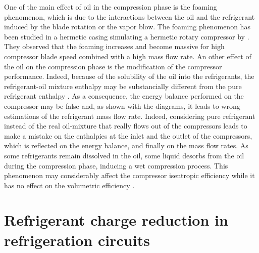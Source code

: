 One of the main effect of oil in the compression phase is the foaming
phenomenon, which is due to the interactions between the oil and the
refrigerant induced by the blade rotation or the vapor blow. The
foaming phenomenon has been studied in a hermetic casing simulating
a hermetic rotary compressor by
\citet{Yanagisawa-Fukuta-1991a}. They observed that the foaming
increases and become massive for high compressor blade speed combined
with a high mass flow rate. An other effect of the oil on the
compression phase is the modification of the compressor
performance. Indeed, because of the solubility of the oil into the
refrigerants, the refrigerant-oil mixture
enthalpy may be substancially different from the pure refrigerant
enthalpy \citep[Fig.\,2--4,
p.\,288--289]{YoubiIdrissi-Meunier-2003a}. As a consequence, the
energy balance performed on the compressor may be false and, as shown
with the \citet[Fig.\,2--4, p.\,288--289]{YoubiIdrissi-Meunier-2003a}
diagrams, it leads to wrong estimations of the refrigerant mass flow
rate. Indeed, considering pure refrigerant instead of the real
oil-mixture that really flows out of the compressors leads to make a
mistake on the enthalpies at the inlet and the outlet of the
compressors, which is reflected on the energy balance, and finally on
the mass flow rates. As some refrigerants remain dissolved in the oil,
some liquid desorbs from the oil during the compression phase,
inducing a wet compression process. This phenomenon may considerably
affect the compressor isentropic efficiency while it has no effect on
the volumetric efficiency \citep{Wang-Dickson-2006a}.


\section{Refrigerant charge reduction in
  refrigeration circuits}

